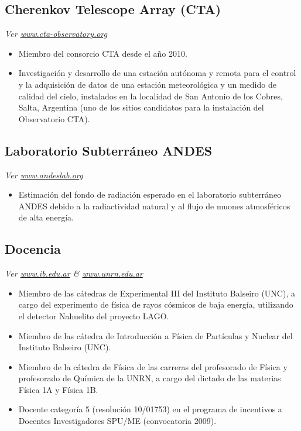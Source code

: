 \subsection*{Cherenkov Telescope Array (CTA)}
{\small{\textit{Ver \href{http://www.cta-observatory.org}{www.cta-observatory.org}}}}
\begin{itemize}
\item Miembro del consorcio CTA desde el año 2010.
\item Investigación y desarrollo de una estación autónoma y remota para el control y la adquisición de datos de una estación meteorológica y un medido de calidad del cielo, instalados en la localidad de San Antonio de los Cobres, Salta, Argentina (uno de los sitios candidatos para la instalación del Observatorio CTA).
\end{itemize}

\subsection*{Laboratorio Subterráneo ANDES}
{\small{\textit{Ver \href{http://www.andeslab.org}{www.andeslab.org}}}}
\begin{itemize}
\item Estimación del fondo de radiación esperado en el laboratorio subterráneo ANDES debido a la radiactividad natural y al flujo de muones atmosféricos de alta energía.
\end{itemize}

\subsection*{Docencia}
{\small{\textit{Ver \href{http://www.ib.edu.ar}{www.ib.edu.ar} \& \href{http://www.unrn.edu.ar}{www.unrn.edu.ar}}}}
\begin{itemize}
\item Miembro de las cátedras de Experimental III del Instituto Balseiro (UNC), a cargo del experimento de física de rayos cósmicos de baja energía, utilizando el detector Nahuelito del proyecto LAGO.
\item Miembro de las cátedra de Introducción a Física de Partículas y Nuclear del Instituto Balseiro (UNC).
\item Miembro de la cátedra de Física de las carreras del profesorado de Física y profesorado de Química de la UNRN, a cargo del dictado de las materias Física 1A y Física 1B.
\item Docente categoría 5 (resolución 10/01753) en el programa de incentivos a Docentes Investigadores SPU/ME (convocatoria 2009).
\end{itemize}
\fi
